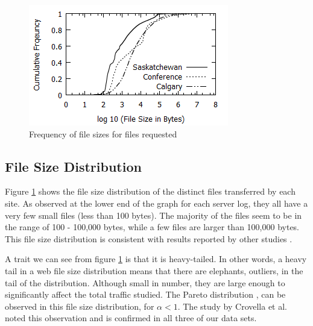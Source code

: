 \documentclass[10pt,conference]{IEEEtran}
\begin{document}
\begin{figure}[t]
    \includegraphics{images/filesize}
    \caption{Frequency of file sizes for files requested}\label{fig:filesize}
\end{figure}

\subsection{File Size Distribution} %
\label{sub:file_size_distribution}
Figure \ref{fig:filesize} shows the file size distribution of the distinct files transferred by each site. As observed at the lower end of the graph for each server log, they all have a very few small files (less than 100 bytes). The majority of the files seem to be in the range of 100 - 100,000 bytes, while a few files are larger than 100,000 bytes. This file size distribution is consistent with results reported by other studies \cite{keynote, Braun}.

A trait we can see from figure \ref{fig:filesize} is that it is heavy-tailed. In other words, a heavy tail in a web file size distribution means that there are elephants, outliers, in the tail of the distribution. Although small in number, they are large enough to significantly affect the total traffic studied. The Pareto distribution \cite{Kotz}, can be observed in this file size distribution, for \begin{math} \alpha < 1\end{math}. The study by Crovella et al. \cite{Crovella} noted this observation and is confirmed in all three of our data sets.
\end{document}
